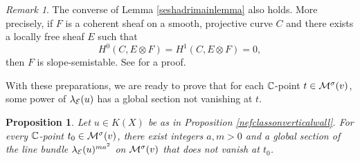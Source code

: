 \documentclass[letterpaper,11pt]{amsart}%
\newtheorem{prop}[thm]{Proposition}
\theoremstyle{remark}
\newtheorem{rmk}[thm]{Remark}
\begin{document}
\begin{rmk}
    The converse of Lemma \ref{seshadrimainlemma} also holds. More precisely, if $F$ is a coherent sheaf on a smooth, projective curve $C$ and there exists a locally free sheaf $E$ such that
    \[ H^0(C, E \otimes F) = H^1(C, E \otimes F) = 0, \]
    then $F$ is slope-semistable. See \cite[Theorem 2.13]{MS} for a proof.
\end{rmk}

With these preparations, we are ready to prove that for each $\mathbb{C}$-point $t \in \mathcal{M}^\sigma(v)$, some power of $\lambda_{\mathcal{E}}(u)$ has a global section not vanishing at $t$. 

\begin{prop}\label{globalgen}
    Let $u \in K(X)$ be as in Proposition \ref{nefclassonverticalwall}. For every $\mathbb{C}$-point $t_0 \in \mathcal{M}^\sigma(v)$, there exist integers $a, m > 0$ and a global section of the line bundle $\lambda_{\mathcal{E}}(u)^{m a^2}$ on $\mathcal{M}^\sigma(v)$ that does not vanish at $t_0$.
\end{prop}
\end{document}
